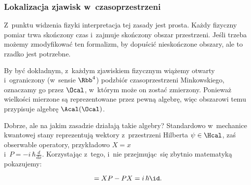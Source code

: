 \documentclass[10pt,t]{beamer}
\begin{document}
\begin{frame}
  \frametitle{Lokalizacja zjawisk w~czasoprzestrzeni}


  Z~punktu widzenia fizyki interpretacja tej zasady jest prosta. Każdy
  fizyczny pomiar trwa skończony czas i~zajmuje skończony obszar
  przestrzeni. Jeśli trzeba możemy zmodyfikować ten formalizm, by dopuścić
  nieskończone obszary, ale to rzadko jest potrzebne.

  By być dokładnym, z~każdym zjawiskiem fizycznym wiążemy otwarty
  i~ograniczony (w~sensie $\Rbb^{ 4 }$) podzbiór czasoprzestrzeni
  Minkowskiego, oznaczamy go przez $\Ocal$, w~którym może on zostać
  zmierzony. Ponieważ wielkości mierzone są reprezentowane przez pewną
  algebrę, więc obszarowi temu przypisuje algebrę $\Acal( \Ocal )$.

  Dobrze, ale na jakim zasadzie działają takie algebry? Standardowo
  w~mechanice kwantowej stany reprezentują wektory z~przestrzeni
  Hilberta $\psi \in \Hcal$, zaś obserwable operatory, przykładowo $X = x$ \\
  i~$P = -i \, \hbar \frac{ d }{ dx }$. Korzystając z~tego, i~nie
  przejmując~się zbytnio matematyką pokazujemy:

  \vspace{-2em}



  \begin{equation}
    [ X, P ] = XP - PX = i \, \hbar \id.
  \end{equation}

\end{frame}
\end{document}
